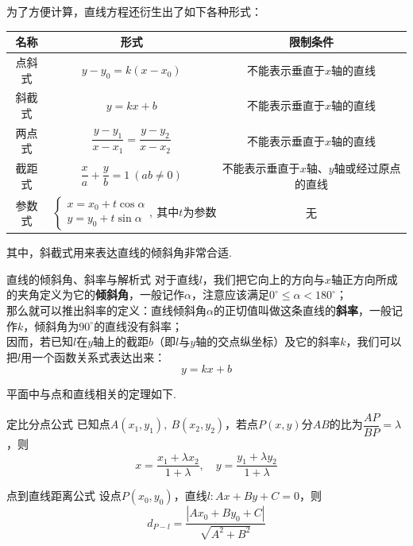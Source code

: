 \documentclass[lang=cn, zihao=4.5]{elegantbook}
\begin{document}
为了方便计算，直线方程还衍生出了如下各种形式：

\begin{table}[h]
	\centering
	\renewcommand\arraystretch{1.5}
	\begin{tabular}{ccc}
		\toprule
		名称&形式&限制条件 \\
		\midrule
		点斜式 & $y-y_0=k(x-x_0)$ & 不能表示垂直于$x$轴的直线 \\
		斜截式 & $y=kx+b$ & 不能表示垂直于$x$轴的直线 \\
		两点式 & $\dfrac{y-y_1}{x-x_1}=\dfrac{y-y_2}{x-x_2}$ & 不能表示垂直于$x$轴的直线 \\
		截距式 & $\dfrac{x}{a}+\dfrac{y}{b}=1~(ab \neq 0)$ & 不能表示垂直于$x$轴、$y$轴或经过原点的直线 \\
		参数式 & $\begin{cases}
			x=x_0+t\cos \alpha \\
			y=y_0+t\sin \alpha
		\end{cases},~\textit{其中}t\textit{为参数}$ & 无 \\
		\bottomrule
	\end{tabular}
\end{table}

其中，斜截式用来表达直线的倾斜角非常合适.

\begin{definition}{直线的倾斜角、斜率与解析式}
    对于直线$l$，我们把它向上的方向与$x$轴正方向所成的夹角定义为它的\textbf{倾斜角}，一般记作$\alpha$，注意应该满足$0^{\circ} \leq \alpha < 180^{\circ}$；\\
    那么就可以推出斜率的定义：直线倾斜角$\alpha$的正切值叫做这条直线的\textbf{斜率}，一般记作$k$，倾斜角为$90^{\circ}$的直线没有斜率；\\
    因而，若已知$l$在$y$轴上的截距$b$（即$l$与$y$轴的交点纵坐标）及它的斜率$k$，我们可以把$l$用一个函数关系式表达出来：$$y=kx+b$$
\end{definition}

平面中与点和直线相关的定理如下.

\begin{theorem}{定比分点公式}
	已知点$A(x_1,y_1),~B(x_2,y_2)$，若点$P(x,y)$分$AB$的比为$\dfrac{AP}{BP}=\lambda$，则$$x=\frac{x_1+\lambda x_2}{1+\lambda}, \quad y = \frac{y_1+\lambda y_2}{1+\lambda}$$
\end{theorem}

\begin{theorem}{点到直线距离公式}
	设点$P(x_0,y_0)$，直线$l:Ax+By+C=0$，则$$d_{P-l}=\frac{|Ax_0+By_0+C|}{\sqrt{A^2+B^2}}$$
\end{theorem}
\end{document}
